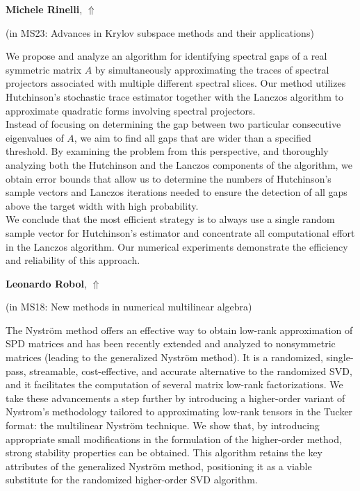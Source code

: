 \documentclass[ILAS2025-program.tex]{subfiles}
\begin{document}
     \hypertarget{down0240}{}\begin{ilasabstract}
    
    \textbf{Michele Rinelli},  \hfill \hyperlink{up0240}{$\Uparrow$}
    
    (in {\color{mstitle}MS23: Advances in Krylov subspace methods and their applications})
        
        \mtskip
    We propose and analyze an algorithm for identifying spectral gaps of a real symmetric matrix $A$ by simultaneously approximating the traces of spectral projectors associated with multiple different spectral slices. Our method utilizes Hutchinson's stochastic trace estimator together with the Lanczos algorithm to approximate quadratic forms involving spectral projectors.\\
Instead of focusing on determining the gap between two particular consecutive eigenvalues of $A$, we aim to find all gaps that are wider than a specified threshold. By examining the problem from this perspective, and thoroughly analyzing both the Hutchinson and the Lanczos components of the algorithm, we obtain error bounds that allow us to determine the numbers of Hutchinson's sample vectors and Lanczos iterations needed to ensure the detection of all gaps above the target width with high probability.\\
We conclude that the most efficient strategy is to always use a single random sample vector for Hutchinson's estimator and concentrate all computational effort in the Lanczos algorithm. Our numerical experiments demonstrate the efficiency and reliability of this approach.
\end{ilasabstract}
     \hypertarget{down0037}{}\begin{ilasabstract}
    
    \textbf{Leonardo Robol},  \hfill \hyperlink{up0037}{$\Uparrow$}
    
    (in {\color{mstitle}MS18: New methods in numerical multilinear algebra})
        
        \mtskip
    The Nystr\"om method offers an effective way to obtain low-rank approximation of SPD matrices and has been recently extended and analyzed to nonsymmetric matrices (leading to the generalized Nystr\"om method). It is a randomized, single-pass, streamable, cost-effective, and accurate alternative to the randomized SVD, and it facilitates the computation of several matrix low-rank factorizations. We take these advancements a step further by introducing a higher-order variant of Nystrom’s methodology tailored to approximating low-rank tensors in the Tucker format: the multilinear Nystr\"om technique. We show that, by introducing appropriate small modifications in the formulation of the higher-order method, strong stability properties can be obtained. This algorithm retains the key attributes of the generalized Nystr\"om method, positioning it as a viable substitute for the randomized higher-order SVD algorithm.\end{ilasabstract}
\end{document}

